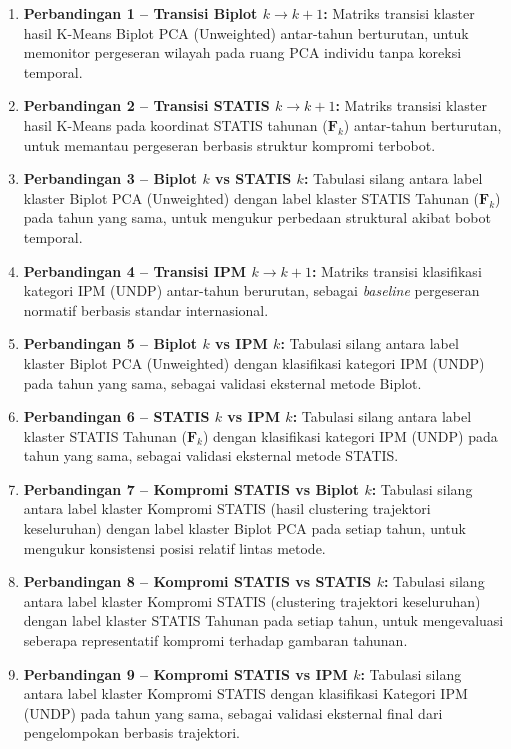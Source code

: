 \begin{enumerate}
    \item \textbf{Perbandingan 1 -- Transisi Biplot $k \to k+1$:} Matriks transisi klaster hasil K-Means Biplot PCA (Unweighted) antar-tahun berturutan, untuk memonitor pergeseran wilayah pada ruang PCA individu tanpa koreksi temporal.
    \item \textbf{Perbandingan 2 -- Transisi STATIS $k \to k+1$:} Matriks transisi klaster hasil K-Means pada koordinat STATIS tahunan ($\mathbf{F}_k$) antar-tahun berturutan, untuk memantau pergeseran berbasis struktur kompromi terbobot.
    \item \textbf{Perbandingan 3 -- Biplot $k$ vs STATIS $k$:} Tabulasi silang antara label klaster Biplot PCA (Unweighted) dengan label klaster STATIS Tahunan ($\mathbf{F}_k$) pada tahun yang sama, untuk mengukur perbedaan struktural akibat bobot temporal.
    \item \textbf{Perbandingan 4 -- Transisi IPM $k \to k+1$:} Matriks transisi klasifikasi kategori IPM (UNDP) antar-tahun berurutan, sebagai \textit{baseline} pergeseran normatif berbasis standar internasional.
    \item \textbf{Perbandingan 5 -- Biplot $k$ vs IPM $k$:} Tabulasi silang antara label klaster Biplot PCA (Unweighted) dengan klasifikasi kategori IPM (UNDP) pada tahun yang sama, sebagai validasi eksternal metode Biplot.
    \item \textbf{Perbandingan 6 -- STATIS $k$ vs IPM $k$:} Tabulasi silang antara label klaster STATIS Tahunan ($\mathbf{F}_k$) dengan klasifikasi kategori IPM (UNDP) pada tahun yang sama, sebagai validasi eksternal metode STATIS.
    \item \textbf{Perbandingan 7 -- Kompromi STATIS vs Biplot $k$:} Tabulasi silang antara label klaster Kompromi STATIS (hasil clustering trajektori keseluruhan) dengan label klaster Biplot PCA pada setiap tahun, untuk mengukur konsistensi posisi relatif lintas metode.
    \item \textbf{Perbandingan 8 -- Kompromi STATIS vs STATIS $k$:} Tabulasi silang antara label klaster Kompromi STATIS (clustering trajektori keseluruhan) dengan label klaster STATIS Tahunan pada setiap tahun, untuk mengevaluasi seberapa representatif kompromi terhadap gambaran tahunan.
    \item \textbf{Perbandingan 9 -- Kompromi STATIS vs IPM $k$:} Tabulasi silang antara label klaster Kompromi STATIS dengan klasifikasi Kategori IPM (UNDP) pada tahun yang sama, sebagai validasi eksternal final dari pengelompokan berbasis trajektori.
\end{enumerate}

